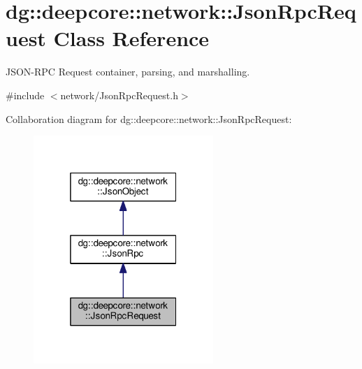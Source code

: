 \hypertarget{classdg_1_1deepcore_1_1network_1_1_json_rpc_request}{}\section{dg\+:\+:deepcore\+:\+:network\+:\+:Json\+Rpc\+Request Class Reference}
\label{classdg_1_1deepcore_1_1network_1_1_json_rpc_request}


J\+S\+O\+N-\/\+R\+PC Request container, parsing, and marshalling.  




{\ttfamily \#include $<$network/\+Json\+Rpc\+Request.\+h$>$}



Collaboration diagram for dg\+:\+:deepcore\+:\+:network\+:\+:Json\+Rpc\+Request\+:
\nopagebreak
\begin{figure}[H]
\begin{center}
\leavevmode
\includegraphics[width=193pt]{classdg_1_1deepcore_1_1network_1_1_json_rpc_request__coll__graph}
\end{center}
\end{figure}
